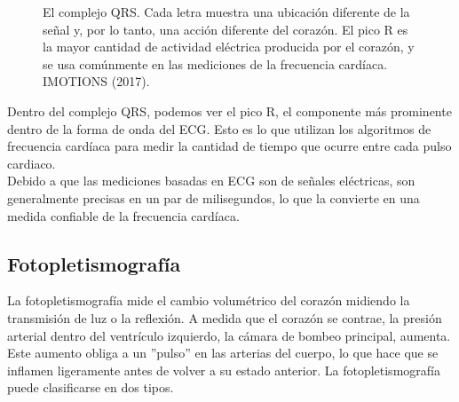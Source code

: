 		\begin{figure}[htbp!]
			\centering
			\caption{El complejo QRS. Cada letra muestra una ubicación diferente de la señal y, por lo tanto, una acción diferente del corazón. El pico R es la mayor cantidad de actividad eléctrica producida por el corazón, y se usa comúnmente en las mediciones de la frecuencia cardíaca. IMOTIONS (2017).}
			\label{fig:ECGwave}
		\end{figure}
		
		Dentro del complejo QRS, podemos ver el pico R, el componente más prominente dentro de la forma de onda del ECG. Esto es lo que utilizan los algoritmos de frecuencia cardíaca para medir la cantidad de tiempo que ocurre entre cada pulso cardiaco. \\
		
		Debido a que las mediciones basadas en ECG son de señales eléctricas, son generalmente precisas en un par de milisegundos, lo que la convierte en una medida confiable de la frecuencia cardíaca. \cite{imotionsECG}
		
		\subsection{Fotopletismografía}
			La fotopletismografía mide el cambio volumétrico del corazón midiendo la transmisión de luz o la reflexión. A medida que el corazón se contrae, la presión arterial dentro del ventrículo izquierdo, la cámara de bombeo principal, aumenta. Este aumento obliga a un ''pulso'' en las arterias del cuerpo, lo que hace que se inflamen ligeramente antes de volver a su estado anterior. La fotopletismografía puede clasificarse en dos tipos. \cite{agarwalHS}
			
